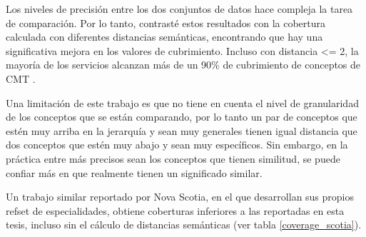 Los niveles de precisión entre los dos conjuntos de datos hace compleja la tarea de comparación. Por lo tanto, contrasté estos resultados con la cobertura calculada con diferentes distancias semánticas, encontrando que hay una significativa mejora en los valores de cubrimiento. Incluso con distancia \textless= 2,  la mayoría de los servicios alcanzan más de un 90\% de cubrimiento de conceptos de \acrshort{CMT} .

Una limitación de este trabajo es que  no tiene en cuenta el nivel de granularidad de los conceptos que se están comparando, por lo tanto un par de conceptos que estén muy arriba en la jerarquía y sean muy generales tienen igual distancia que dos conceptos que estén muy abajo y sean muy específicos. Sin embargo, en la práctica entre más precisos sean los conceptos que tienen similitud, se puede confiar más en que realmente tienen un significado similar.

Un trabajo similar reportado por Nova Scotia\cite{nova}, en el que desarrollan sus propios {\acrshort{refset}} de especialidades, obtiene coberturas inferiores a las reportadas en esta tesis, incluso sin el cálculo de distancias semánticas (ver tabla \ref{coverage_scotia}). 

\begin{table}
 \caption{Comparación de la cobertura de las especialidades del HIBA vs Nova Scotia }
  \label{coverage_scotia}
\end{table}

